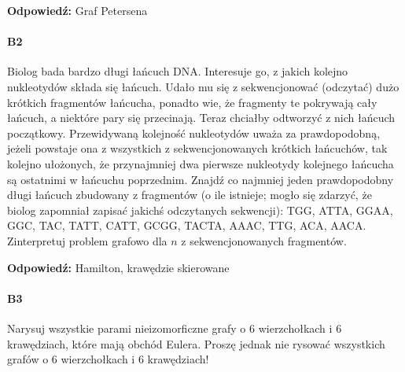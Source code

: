 \textbf{Odpowiedź: }Graf Petersena
\paragraph{B2} Biolog bada bardzo długi łańcuch DNA. Interesuje go, z jakich kolejno nukleotydów składa się łańcuch. Udało mu się z sekwencjonować (odczytać) dużo krótkich fragmentów łańcucha, ponadto wie, że fragmenty te pokrywają cały łańcuch, a niektóre pary się przecinają. Teraz chciałby odtworzyć z nich łańcuch początkowy. Przewidywaną kolejność nukleotydów uważa za prawdopodobną, jeżeli powstaje ona z wszystkich z sekwencjonowanych krótkich łańcuchów, tak kolejno ułożonych, że przynajmniej dwa pierwsze nukleotydy kolejnego łańcucha są ostatnimi w łańcuchu poprzednim. Znajdź co najmniej jeden prawdopodobny długi łańcuch zbudowany z fragmentów (o ile istnieje; mogło się zdarzyć, że biolog zapomniał zapisać jakichś odczytanych sekwencji): TGG, ATTA, GGAA, GGC, TAC, TATT, CATT, GCGG, TACTA, AAAC, TTG, ACA, AACA.
Zinterpretuj problem grafowo dla $n$ z sekwencjonowanych fragmentów.

\textbf{Odpowiedź: }Hamilton, krawędzie skierowane
\paragraph{B3} Narysuj wszystkie parami nieizomorficzne grafy o $6$ wierzchołkach i $6$ krawędziach, które mają obchód Eulera. Proszę jednak nie rysować wszystkich grafów o $6$ wierzchołkach i $6$ krawędziach!

